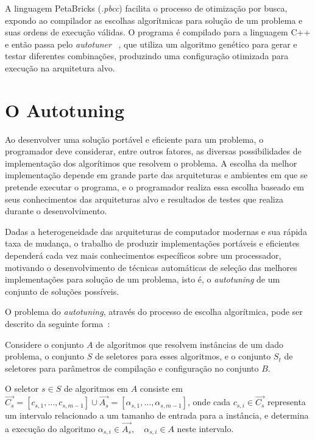 \documentclass[a4paper, 11pt, twoside]{article}
\begin{document}
A linguagem PetaBricks (\emph{.pbcc}) facilita o processo de 
otimização por busca, expondo ao compilador as escolhas algorítmicas para 
solução de um problema e suas ordens de execução válidas. O programa é 
compilado para a linguagem C++ e então passa pelo \emph{autotuner} 
~\cite{ansel2011efficient}, que utiliza um algoritmo genético para gerar e 
testar diferentes combinações, produzindo uma configuração otimizada para 
execução na arquitetura alvo.

\section{O Autotuning} \label{sec:autotuning}

Ao desenvolver uma solução portável e eficiente para um problema, o
programador deve considerar, entre outros fatores, as diversas possibilidades
de implementação dos algorítimos que resolvem o problema. A escolha da melhor
implementação depende em grande parte das arquiteturas e ambientes em que se 
pretende executar o programa, e o programador realiza essa escolha baseado
em seus conhecimentos das arquiteturas alvo e resultados de testes que realiza
durante o desenvolvimento. 

Dadas a heterogeneidade das arquiteturas de computador modernas e sua rápida 
taxa de mudança, o trabalho de produzir implementações portáveis e eficientes 
dependerá cada vez mais conhecimentos específicos sobre um processador,
motivando o desenvolvimento de técnicas automáticas de seleção das melhores
implementações para solução de um problema, isto é, o \emph{autotuning} de um
conjunto de soluções possíveis.

O problema do \emph{autotuning}, através do processo de escolha algorítmica,
pode ser descrito da seguinte forma~\cite{ansel2011efficient}:

Considere o conjunto $A$ de algoritmos que resolvem instâncias de um dado 
problema, o conjunto $S$ de seletores para esses algoritmos, e o conjunto $S_t$
de seletores para parâmetros de compilação e configuração no conjunto $B$.

O seletor $s \in S$ de algoritmos em $A$ consiste em 
$\overrightarrow{C_s} = [c_{s,1},\dots,c_{s,m-1}] \cup \overrightarrow{A_s} = 
[\alpha_{s,1},\dots,\alpha_{s,m-1}]$,
onde cada $c_{s,i} \in \overrightarrow{C_s}$ representa um intervalo 
relacionado a um tamanho de entrada para a instância, e 
determina a execução do algoritmo $\alpha_{s,i} \in \overrightarrow{A_s}, 
\quad \alpha_{s,i} \in A$ neste intervalo. 
\end{document}
